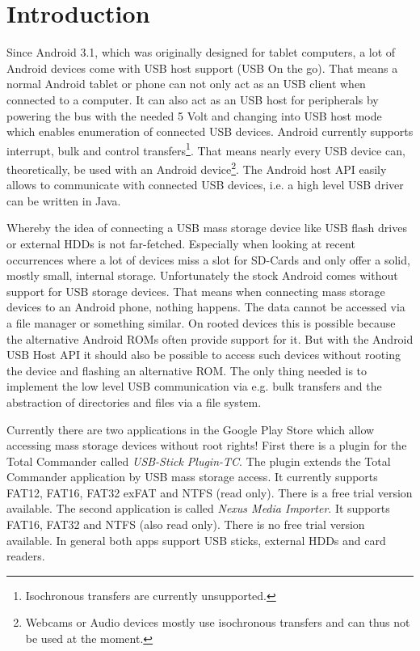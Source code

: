 \chapter{Introduction}
\label{chapter:Introduction}

Since Android 3.1, which was originally designed for tablet computers, a lot of Android devices come with USB host support (USB On the go). That means a normal Android tablet or phone can not only act as an USB client when connected to a computer. It can also act as an USB host for peripherals by powering the bus with the needed 5 Volt and changing into USB host mode which enables enumeration of connected USB devices\cite{android_usb_host}. Android currently supports interrupt, bulk and control transfers\footnote{Isochronous transfers are currently unsupported\cite{android_usb_constants}.}. That means nearly every USB device can, theoretically, be used with an Android device\footnote{Webcams or Audio devices mostly use isochronous transfers and can thus not be used at the moment.}. The Android host API easily allows to communicate with connected USB devices, i.e. a high level USB driver can be written in Java.

Whereby the idea of connecting a USB mass storage device like USB flash drives or external HDDs is not far-fetched. Especially when looking at recent occurrences where a lot of devices miss a slot for SD-Cards and only offer a solid, mostly small, internal storage. Unfortunately the stock Android comes without support for USB storage devices. That means when connecting mass storage devices to an Android phone, nothing happens. The data cannot be accessed via a file manager or something similar. On rooted devices this is possible because the alternative Android ROMs often provide support for it. But with the Android USB Host API it should also be possible to access such devices without rooting the device and flashing an alternative ROM. The only thing needed is to implement the low level USB communication via e.g. bulk transfers and the abstraction of directories and files via a file system.

Currently there are two applications in the Google Play Store which allow accessing mass storage devices without root rights! First there is a plugin for the Total Commander called \textit{USB-Stick Plugin-TC}. The plugin extends the Total Commander application by USB mass storage access. It currently supports FAT12, FAT16, FAT32 exFAT and NTFS (read only). There is a free trial version available. The second application is called \textit{Nexus Media Importer}. It supports FAT16, FAT32 and NTFS (also read only). There is no free trial version available. In general both apps support USB sticks, external HDDs and card readers.

